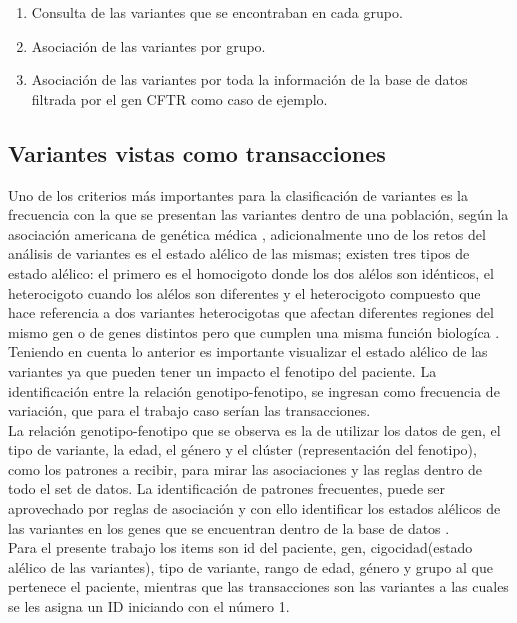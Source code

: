 \begin{enumerate}
	\item Consulta de las variantes que se encontraban en cada grupo. 
	\item Asociación de las variantes por grupo. 
	\item Asociación de las variantes por toda la información de la base de datos filtrada por el gen CFTR como caso de ejemplo. 
\end{enumerate}

\subsection{Variantes vistas como transacciones}

Uno de los criterios más importantes para la clasificación de variantes es la frecuencia con la que se presentan las variantes dentro de una población, según la asociación americana de genética médica \cite{Laboratories2015}, adicionalmente uno de los retos del análisis de variantes es el estado alélico de las mismas; existen tres tipos de estado alélico: el primero es el homocigoto donde los dos alélos son idénticos, el heterocigoto cuando los alélos son diferentes y el heterocigoto compuesto que hace referencia a dos variantes heterocigotas que afectan diferentes regiones del mismo gen o de genes distintos pero que cumplen una misma función biologíca \cite{Klug2013, Compound2012}. \\

Teniendo en cuenta lo anterior es importante visualizar el estado alélico de las variantes \cite{Hannah-Shmouni2015, Laboratories2015} ya que pueden tener un impacto el fenotipo del paciente. La identificación entre la relación genotipo-fenotipo, se ingresan como frecuencia de variación, que para el trabajo caso serían las transacciones\cite{Breuer2017}. \\

La relación genotipo-fenotipo que se observa es  la de utilizar los datos de gen, el tipo de variante, la edad, el género y el clúster (representación del fenotipo), como los patrones a recibir, para mirar las asociaciones y las reglas dentro de todo el set de datos. La identificación de patrones frecuentes, puede ser aprovechado por reglas de asociación y con ello identificar los estados alélicos de las variantes en los genes que se encuentran dentro de la base de datos \cite{breuler2017}. \\

Para el presente trabajo los items son id del paciente, gen, cigocidad(estado alélico de las variantes), tipo de variante, rango de edad, género y grupo al que pertenece el paciente, mientras que las transacciones son las variantes a las cuales se les asigna un ID iniciando con el número 1. 

